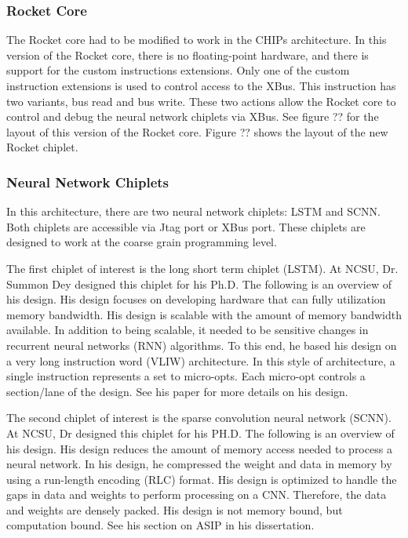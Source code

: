 \documentclass[../main.tex]{subfiles}
\begin{document}
\subsubsection{Rocket Core}
The Rocket core had to be modified to work in the CHIPs architecture. In this version of the Rocket core, there is no floating-point hardware, and there is support for the custom instructions extensions. Only one of the custom instruction extensions is used to control access to the XBus. This instruction has two variants, bus read and bus write. These two actions allow the Rocket core to control and debug the neural network chiplets via XBus. See figure ?? for the layout of this version of the Rocket core. Figure ?? shows the layout of the new Rocket chiplet.
\subsubsection{Neural Network Chiplets}
In this architecture, there are two neural network chiplets: LSTM and SCNN. Both chiplets are accessible via Jtag port or XBus port. These chiplets are designed to work at the coarse grain programming level. 

The first chiplet of interest is the long short term chiplet (LSTM). At NCSU, Dr. Summon Dey designed this chiplet for his Ph.D. The following is an overview of his design. His design focuses on developing hardware that can fully utilization memory bandwidth. His design is scalable with the amount of memory bandwidth available. In addition to being scalable, it needed to be sensitive changes in recurrent neural networks (RNN) algorithms. To this end, he based his design on a very long instruction word (VLIW) architecture. In this style of architecture, a single instruction represents a set to micro-opts. Each micro-opt controls a section/lane of the design. See his paper for more details on his design\cite{Summon-Dey-LSTM}. 

The second chiplet of interest is the sparse convolution neural network (SCNN). At NCSU, Dr designed this chiplet for his PH.D. The following is an overview of his design. His design reduces the amount of memory access needed to process a neural network. In his design, he compressed the weight and data in memory by using a run-length encoding (RLC) format. His design is optimized to handle the gaps in data and weights to perform processing on a CNN. Therefore, the data and weights are densely packed. His design is not memory bound, but computation bound. See his section on ASIP in his dissertation\cite{LeWeifuDissertation}.
\end{document}
